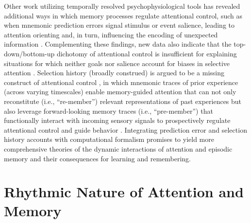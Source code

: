 Other work utilizing temporally resolved psychophysiological tools has revealed additional ways in which memory processes regulate attentional control, such as when mnemonic prediction errors signal stimulus or event salience, leading to attention orienting \parencite{denouden2012how} and, in turn, influencing the encoding of unexpected information \parencite{bein2021mnemonic}. Complementing these findings, new data also indicate that the top-down/bottom-up dichotomy of attentional control is insufficient for explaining situations for which neither goals nor salience account for biases in selective attention \parencite[e.g., rewards associated with equally salient stimuli in conflict with current selection goals;][]{awh2012top}. Selection history (broadly construed) is argued to be a missing construct of attentional control \parencite[for a review, see][]{anderson2021past}, in which mnemonic traces of prior experience (across varying timescales) enable memory-guided attention that can not only reconstitute (i.e., ``re-member'') relevant representations of past experiences but also leverage forward-looking memory traces (i.e., ``pre-member'') that functionally interact with incoming sensory signals to prospectively regulate attentional control and guide behavior \parencite{hutchinson2012memory,nobre2019premembering}. Integrating prediction error and selection history accounts with computational formalism promises to yield more comprehensive theories of the dynamic interactions of attention and episodic memory and their consequences for learning and remembering.

\section{Rhythmic Nature of Attention and Memory}

